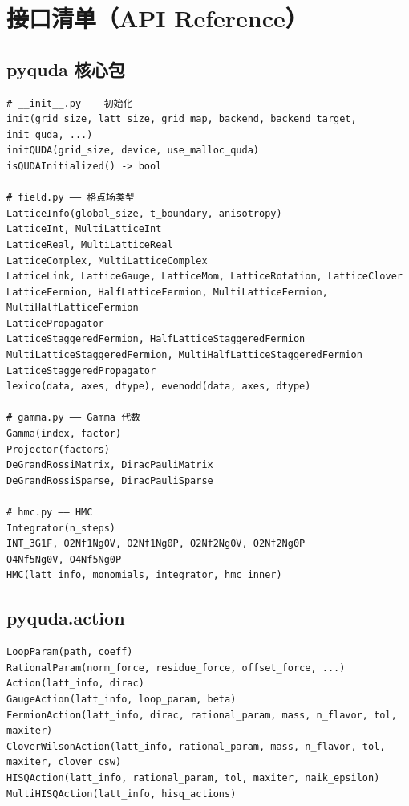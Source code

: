 \documentclass[12pt,a4paper]{ctexart}
\begin{document}
\section{接口清单（API Reference）}

\subsection{pyquda 核心包}

\begin{lstlisting}[style=pycode]
# __init__.py —— 初始化
init(grid_size, latt_size, grid_map, backend, backend_target, init_quda, ...)
initQUDA(grid_size, device, use_malloc_quda)
isQUDAInitialized() -> bool

# field.py —— 格点场类型
LatticeInfo(global_size, t_boundary, anisotropy)
LatticeInt, MultiLatticeInt
LatticeReal, MultiLatticeReal
LatticeComplex, MultiLatticeComplex
LatticeLink, LatticeGauge, LatticeMom, LatticeRotation, LatticeClover
LatticeFermion, HalfLatticeFermion, MultiLatticeFermion, MultiHalfLatticeFermion
LatticePropagator
LatticeStaggeredFermion, HalfLatticeStaggeredFermion
MultiLatticeStaggeredFermion, MultiHalfLatticeStaggeredFermion
LatticeStaggeredPropagator
lexico(data, axes, dtype), evenodd(data, axes, dtype)

# gamma.py —— Gamma 代数
Gamma(index, factor)
Projector(factors)
DeGrandRossiMatrix, DiracPauliMatrix
DeGrandRossiSparse, DiracPauliSparse

# hmc.py —— HMC
Integrator(n_steps)
INT_3G1F, O2Nf1Ng0V, O2Nf1Ng0P, O2Nf2Ng0V, O2Nf2Ng0P
O4Nf5Ng0V, O4Nf5Ng0P
HMC(latt_info, monomials, integrator, hmc_inner)
\end{lstlisting}

\subsection{pyquda.action}

\begin{lstlisting}[style=pycode]
LoopParam(path, coeff)
RationalParam(norm_force, residue_force, offset_force, ...)
Action(latt_info, dirac)
GaugeAction(latt_info, loop_param, beta)
FermionAction(latt_info, dirac, rational_param, mass, n_flavor, tol, maxiter)
CloverWilsonAction(latt_info, rational_param, mass, n_flavor, tol, maxiter, clover_csw)
HISQAction(latt_info, rational_param, tol, maxiter, naik_epsilon)
MultiHISQAction(latt_info, hisq_actions)
\end{lstlisting}
\end{document}
